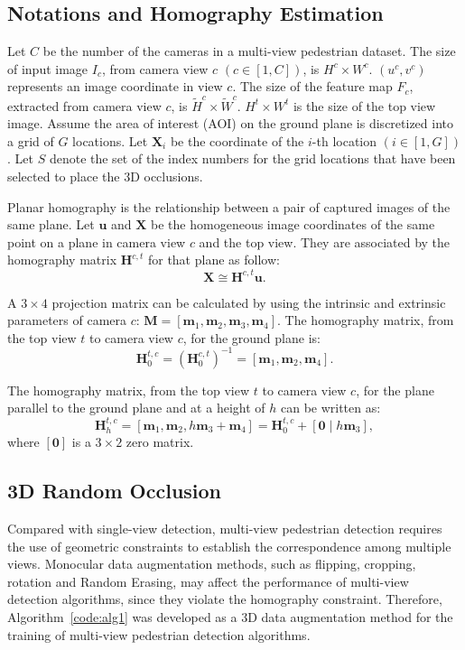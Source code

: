 \documentclass[runningheads]{llncs}
\begin{document}
	\subsection{Notations and Homography Estimation}
	Let $C$ be the number of the cameras in a multi-view pedestrian dataset. The size of input image $I_c$, from camera view $c$ $(c\in [1, C])$, is $H^c \times W^c$. $(u^c,v^c)$ represents an image coordinate in view $c$. The size of the feature map $F_c$, extracted from camera view $c$, is $\widetilde{H}^c \times \widetilde{W}^c$. $H^t \times W^t$ is the size of the top view image. Assume the area of interest (AOI) on the ground plane is discretized into a grid of $G$ locations. Let $\textbf{X}_i$ be the coordinate of the $i$-th location $(i \in [1, G])$. Let $S$ denote the set of the index numbers for the grid locations that have been selected to place the 3D occlusions.
	
	Planar homography is the relationship between a pair of captured images of the same plane.	
	Let $\textbf{u}$ and $\textbf{X}$ be the homogeneous image coordinates of the same point on a plane in  camera view $c$ and the top view. They are associated by the homography matrix $\textbf{H}^{c,t}$ for that plane as follow:
	\begin{equation}
		\textbf{X} \cong \textbf{H}^{c,t}\textbf{u}.
	\end{equation}


	A $3 \times 4$ projection matrix can be calculated by using the intrinsic and extrinsic parameters of  camera $c$: $\textbf{M} = [\textbf{m}_1,\textbf{m}_2,\textbf{m}_3,\textbf{m}_4]$. 	
	The homography matrix, from the top view $t$ to camera view $c$, for the ground plane is:
	\begin{equation}
		\textbf{H}^{t,c}_{0} = (\textbf{H}^{c,t}_{0})^{-1} = [\textbf{m}_1,\textbf{m}_2,\textbf{m}_4].
	\end{equation}
	
	The homography matrix, from the top view $t$ to camera view $c$, for the plane parallel to the ground plane and at a height of $h$ can be written as:
	\begin{equation}
		\textbf{H}^{t,c}_{h} = [\textbf{m}_1,\textbf{m}_2,h\textbf{m}_3 + \textbf{m}_4] = \textbf{H}^{t,c}_{0} +  [\textbf{0}\mid h\textbf{m}_3],
	\end{equation}
	where $[\textbf{0}]$ is a $3 \times 2$ zero matrix.
	
	
	
	\subsection{3D Random Occlusion}		
	Compared with single-view detection, multi-view pedestrian detection requires the use of geometric constraints to establish the correspondence among multiple views. Monocular data augmentation methods, such as flipping,  cropping, rotation and Random Erasing, may affect the performance of multi-view detection algorithms, since they violate the homography constraint. Therefore, Algorithm~\ref{code:alg1} was developed as a 3D data augmentation method for the training of multi-view pedestrian detection algorithms.
	
\end{document}
